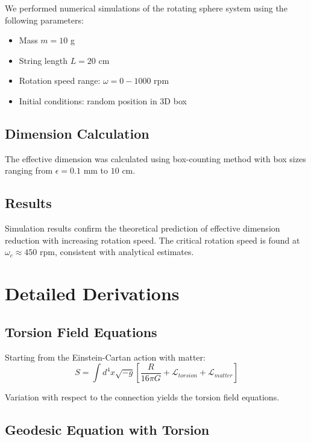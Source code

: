 \documentclass[12pt,a4paper]{article}
\begin{document}
We performed numerical simulations of the rotating sphere system using the following parameters:
\begin{itemize}
    \item Mass $m = 10$ g
    \item String length $L = 20$ cm
    \item Rotation speed range: $\omega = 0 - 1000$ rpm
    \item Initial conditions: random position in 3D box
\end{itemize}

\subsection{Dimension Calculation}

The effective dimension was calculated using box-counting method with box sizes ranging from $\epsilon = 0.1$ mm to $10$ cm.

\subsection{Results}

Simulation results confirm the theoretical prediction of effective dimension reduction with increasing rotation speed. The critical rotation speed is found at $\omega_c \approx 450$ rpm, consistent with analytical estimates.

\section{Detailed Derivations}
\label{app:derivations}

\subsection{Torsion Field Equations}

Starting from the Einstein-Cartan action with matter:
\begin{equation}
    S = \int d^4x \sqrt{-g} \left[\frac{R}{16\pi G} + \mathcal{L}_{torsion} + \mathcal{L}_{matter}\right]
\end{equation}

Variation with respect to the connection yields the torsion field equations.

\subsection{Geodesic Equation with Torsion}
\end{document}
